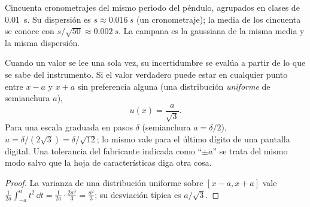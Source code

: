 \begin{omfigure}

{\small Cincuenta cronometrajes del mismo periodo del péndulo, agrupados
en clases de \qty{0.01}{s}. Su dispersión es $s \approx \qty{0.016}{s}$
(un cronometraje); la media de los cincuenta se conoce con
$s/\sqrt{50} \approx \qty{0.002}{s}$. La campana es la gaussiana de la
misma media y la misma dispersión.}
\end{omfigure}

\begin{proposition}\label{prop:b1:units-dimensions:typeB}
Cuando un valor se lee una sola vez, su incertidumbre se evalúa a partir
de lo que se sabe del instrumento. Si el valor verdadero puede estar en
cualquier punto entre $x - a$ y $x + a$ sin preferencia alguna (una
distribución \emph{uniforme} de semianchura $a$),
\[
u(x) = \frac{a}{\sqrt 3} .
\]
Para una escala graduada en pasos $\delta$ (semianchura $a = \delta/2$),
$u = \delta/(2\sqrt3) = \delta/\sqrt{12}$; lo mismo vale para el último
dígito de una pantalla digital. Una tolerancia del fabricante indicada
como ``$\pm a$'' se trata del mismo modo salvo que la hoja de
características diga otra cosa.
\end{proposition}

\begin{proof}
La varianza de una distribución uniforme sobre $[x - a, x + a]$ vale
$\frac{1}{2a}\int_{-a}^{a} t^2\,\dd t = \frac{1}{2a}\cdot\frac{2a^3}{3}
= \frac{a^2}{3}$; su desviación típica es $a/\sqrt3$.
\end{proof}

